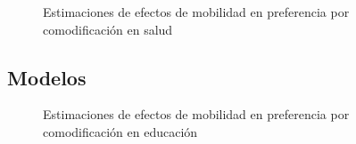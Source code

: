 \documentclass[
  spanish,
  letterpaper,
  DIV=11,
  numbers=noendperiod,
  oneside]{scrartcl}
\begin{document}
\begin{figure}

\caption{\label{fig-mh}Estimaciones de efectos de mobilidad en
preferencia por comodificación en salud}


\end{figure}%

\subsection{Modelos}\label{modelos-1}

\begin{figure}

\caption{\label{fig-me}Estimaciones de efectos de mobilidad en
preferencia por comodificación en educación}


\end{figure}%
\end{document}

